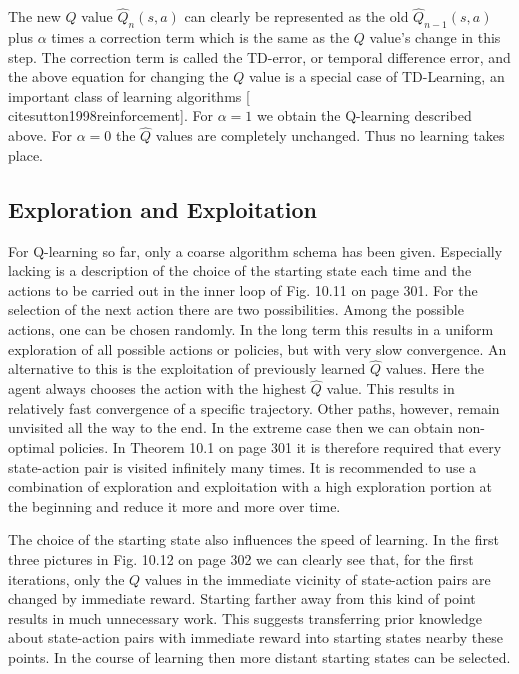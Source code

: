 \documentclass[10pt]{book}
\begin{document}
The new $Q$ value $\hat{Q}_{n}(s, a)$ can clearly be represented as the old $\hat{Q}_{n-1}(s, a)$ plus $\alpha$ times a correction term which is the same as the $Q$ value's change in this step. The correction term is called the TD-error, or temporal difference error, and the above equation for changing the $Q$ value is a special case of TD-Learning, an important class of learning algorithms [\\cite{sutton1998reinforcement}]. For $\alpha=1$ we obtain the Q-learning described above. For $\alpha=0$ the $\hat{Q}$ values are completely unchanged. Thus no learning takes place.

\subsection*{Exploration and Exploitation}
For Q-learning so far, only a coarse algorithm schema has been given. Especially lacking is a description of the choice of the starting state each time and the actions to be carried out in the inner loop of Fig. 10.11 on page 301. For the selection of the next action there are two possibilities. Among the possible actions, one can be chosen randomly. In the long term this results in a uniform exploration of all possible actions or policies, but with very slow convergence. An alternative to this is the exploitation of previously learned $\hat{Q}$ values. Here the agent always chooses the action with the highest $\hat{Q}$ value. This results in relatively fast convergence of a specific trajectory. Other paths, however, remain unvisited all the way to the end. In the extreme case then we can obtain non-optimal policies. In Theorem 10.1 on page 301 it is therefore required that every state-action pair is visited infinitely many times. It is recommended to use a combination of exploration and exploitation with a high exploration portion at the beginning and reduce it more and more over time.

The choice of the starting state also influences the speed of learning. In the first three pictures in Fig. 10.12 on page 302 we can clearly see that, for the first iterations, only the $Q$ values in the immediate vicinity of state-action pairs are changed by immediate reward. Starting farther away from this kind of point results in much unnecessary work. This suggests transferring prior knowledge about state-action pairs with immediate reward into starting states nearby these points. In the course of learning then more distant starting states can be selected.
\end{document}
